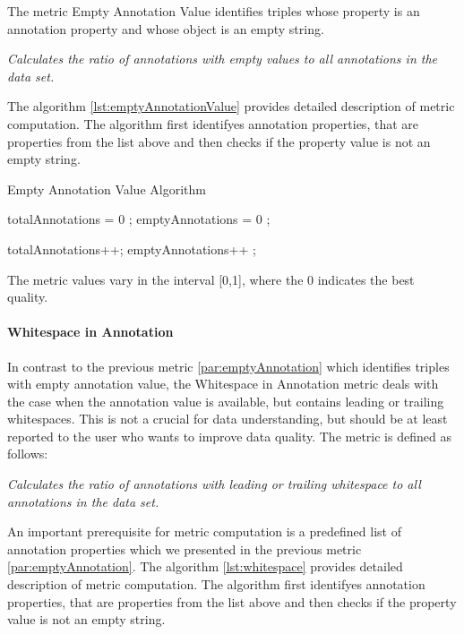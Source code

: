 The metric Empty Annotation Value identifies triples whose property is an annotation property and whose object is an empty string.
 
\begin{mdframed}[style=metricdefinition]
\emph{Calculates the ratio of annotations with empty values to all annotations in the data set.}
\end{mdframed}

The algorithm \ref{lst:emptyAnnotationValue} provides detailed description of metric computation. The algorithm first identifyes annotation properties, that are properties from the list above and then checks if the property value is not an empty string.
\begin{algorithm}
\caption{Empty Annotation Value Algorithm}\label{lst:emptyAnnotationValue}
\begin{algorithmic}[1]
\State totalAnnotations = 0 ;
\State emptyAnnotations = 0 ;
\EndProcedure

 totalAnnotations++; \EndIf
{} emptyAnnotations++ ; \EndIf
{}
\EndProcedure
\end{algorithmic}
\end{algorithm}


The metric values vary in the interval [0,1], where  the 0 indicates the best quality.


\paragraph{Whitespace in Annotation}


In contrast to the previous metric \ref{par:emptyAnnotation} which identifies triples with empty annotation value, the Whitespace in Annotation metric deals with the case when the annotation value is available, but contains leading or trailing whitespaces.
This is not a crucial for data understanding, but should be at least reported to the user who wants to improve data quality.
The metric is defined as follows:

\begin{mdframed}[style=metricdefinition]
\emph{Calculates the ratio of annotations with leading or trailing whitespace to all annotations in the data set.}
\end{mdframed}

An important prerequisite for metric computation is a predefined list of annotation properties  which we presented in the previous metric \ref{par:emptyAnnotation}.
The algorithm \ref{lst:whitespace} provides detailed description of metric computation. The algorithm first identifyes annotation properties, that are properties from the list above and then checks if the property value is not an empty string.


